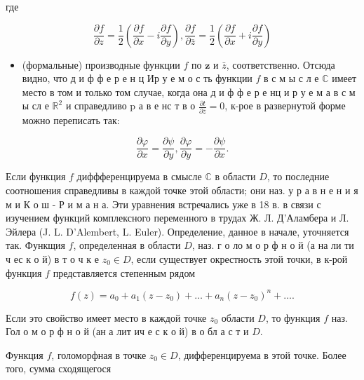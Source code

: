 \documentclass[10pt]{article}
\begin{document}
где



\[

\frac{\partial f}{\partial z}=\frac{1}{2}\left(\frac{\partial f}{\partial x}-i \frac{\partial f}{\partial y}\right), \frac{\partial f}{\partial \bar{z}}=\frac{1}{2}\left(\frac{\partial f}{\partial x}+i \frac{\partial f}{\partial y}\right)

\]



\begin{itemize}

  \item (формальные) производные функции $f$ по $\boldsymbol{z}$ и $\bar{z}$, соответственно. Отсюда видно, что д и ф ф е р е н ц Ир у е м о с ть функции $f$ в с м ы с л е $\mathbb{C}$ имеет место в том и только том случае, когда она д и ф ф е р е нц и р у е м а в с м ы сл е $\mathbb{R}^{2}$ и справедливо $\mathrm{p}$ а в е нс т в о $\frac{\partial t}{\partial \bar{z}}=0$, к-рое в развернутой форме можно переписать так:

\end{itemize}



\[

\frac{\partial \varphi}{\partial x}=\frac{\partial \psi}{\partial y}, \frac{\partial \varphi}{\partial y}=-\frac{\partial \psi}{\partial x} .

\]



Если функция $f$ диффференцируема в смысле $\mathbb{C}$ в области $D$, то последние соотношения справедливы в каждой точке этой области; они наз. у р а в н е н и я м и К о ш - Р и м а н а. Эти уравнения встречались уже в 18 в. в связи с изучением функций комплексного переменного в трудах Ж. Л. Д'Аламбера и Л. Эйлера (J. L. D'Alembert, L. Euler). Определение, данное в начале, уточняется так. Функщия $f$, определенная в области $D$, наз. г о ло м о р ф н о й (а на ли ти ч ес к о й) в т о ч к е $z_{0} \in D$, если существует окрестность этой точки, в к-рой функция $f$ представляется степенным рядом



\[

f(z)=a_{0}+a_{1}\left(z-z_{0}\right)+\ldots+a_{n}\left(z-z_{0}\right)^{n}+\ldots .

\]



Если это свойство имеет место в каждой точке $z_{0}$ области $D$, то функция $f$ наз. Гол о м о р ф н о й (ан а лит ич е с к о й) в о бл а с т и $D$.



Функция $f$, голоморфная в точке $z_{0} \in D$, дифференцируема в этой точке. Более того, сумма сходящегося
\end{document}

